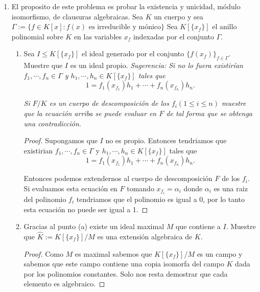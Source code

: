 \documentclass[letter,twoside,12pt]{article}
\begin{document}
\begin{enumerate}
\item El proposito de este problema es probar la existencia y unicidad, módulo isomorfismo, de clausuras
algebraicas. Sea $ K $ un cuerpo y sea $ \Gamma := \{f \in K[x] : f(x)\text{ es irreducible y mónico}\}$ Sea $ K[\{x_f\}] $ el
anillo polinomial sobre $ K $ en las variables $ x_f $ indexadas por el conjunto $ \Gamma $.

\begin{enumerate}
\item Sea $ I \leq K[\{x_f\}] $ el ideal generado por el conjunto $ \{f(x_f) \}_{f \in \Gamma} $. Muestre que $ I $ es un ideal propio. \textit{Sugerencia: Si no lo fuera existirían $ f_1,\cdots, f_n \in \Gamma $ y $ h_1,\cdots, h_n \in K[\{x_f \}] $ tales que}
\begin{equation}
1 = f_1(x_{f_1})h_1 + \cdots + f_n(x_{f_n})h_n. \nonumber
\end{equation}

\textit{Si $ F
/K $ es un cuerpo de descomposición de los $ f_i(1 \leq i \leq n) $ muestre que la ecuación arriba se puede evaluar en $ F $ de tal forma que se obtenga una contradicción.}

\begin{proof}

Supongamos que $ I $ no es propio. Entonces tendriamos que existirian $ f_1,\cdots, f_n \in \Gamma $ y $ h_1,\cdots, h_n \in K[\{x_f \}] $ tales que
\begin{equation}
1 = f_1(x_{f_1})h_1 + \cdots + f_n(x_{f_n})h_n. \nonumber
\end{equation}

Entonces podemos extendernos al cuerpo de descomposición $ F $ de los $ f_i $. Si evaluamos esta ecuación en $ F $ tomando $ x_{f_i}=\alpha_i $ donde $ \alpha_i $ es una raiz del polinomio $ f_i $ tendriamos que el polinomio es igual a 0, por lo tanto esta ecuación no puede ser igual a 1.
\end{proof}

\item Gracias al punto (a) existe un ideal maximal $ M $ que contiene a $ I $. Muestre que $ \hat{K}
:= K[\{x_f\}]/M $ es una extensión algebraica de $ K $.

\begin{proof}
Como $ M $ es maximal sabemos que $ K[\{x_f\}]/M $ es un campo y sabemos que este campo contiene una copia isomorfa del campo $ K $ dada por los polinomios constantes. Solo nos resta demostrar que cada elemento es algebraico. 


\end{proof}
\end{enumerate}
\end{enumerate}
\end{document}
